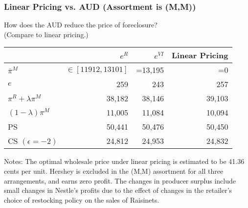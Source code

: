 \documentclass[aspectratio=169]{beamer}
\begin{document}
\begin{frame}
\frametitle{Linear Pricing vs. AUD (Assortment is (M,M))}
How does the AUD reduce the price of foreclosure? \\ (Compare to linear pricing.)
\begin{table}[h!]
  \begin{center}
   \label{tab:linearpricing}
    \begin{tabular}{|l|rrr|} 
    \hline 
          & $e^{R}$ & $e^{VI}$ & Linear Pricing   \\ \hline
    $\overline{\pi}^M$ & $\in[11912,13101]$ & =13,195 & =0      \\
    $e$ & 259   & 243   & 257    \\
    $\pi^R + \lambda \pi^M$ & 38,182 & 38,146 & 39,103   \\
    $(1-\lambda) \pi^M$ & 11,005 & 11,084 & 10,094   \\
\hline
    PS & 50,441 & 50,476 & 50,450         \\ 
    CS $(\epsilon=-2)$& 24,812 & 24,953 & 24,832         \\ \hline 
   \end{tabular}
   \end{center}
 \tiny
Notes: The optimal wholesale price under linear pricing is estimated to be 41.36 cents per unit.  Hershey is excluded in the (M,M) assortment for all three arrangements, and earns zero profit.  The changes in producer surplus include small changes in Nestle's profits due to the effect of changes in the retailer's choice of restocking policy on the sales of Raisinets. 
\end{table}

\end{frame}
\end{document}
